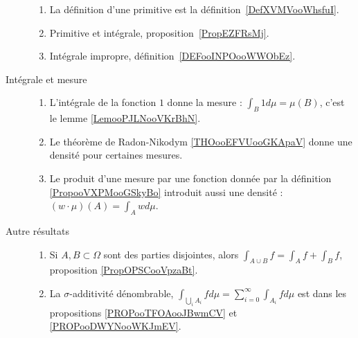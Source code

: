 \begin{description}
\begin{enumerate}
			\item
			      La définition d'une primitive est la définition~\ref{DefXVMVooWhsfuI}.
			\item
			      Primitive et intégrale, proposition~\ref{PropEZFRsMj}.
			\item
			      Intégrale impropre, définition~\ref{DEFooINPOooWWObEz}.
		\end{enumerate}
	\item[Intégrale et mesure]
		\begin{enumerate}
			\item
			      L'intégrale de la fonction \( 1\) donne la mesure : \( \int_B1d\mu=\mu(B)\), c'est le lemme \ref{LemooPJLNooVKrBhN}.
			\item
			      Le théorème de Radon-Nikodym \ref{THOooEFVUooGKApaV} donne une densité pour certaines mesures.
			\item
			      Le produit d'une mesure par une fonction donnée par la définition \ref{PropooVXPMooGSkyBo} introduit aussi une densité : \( (w\cdot \mu)(A)=\int_Awd\mu\).
		\end{enumerate}

	\item[Autre résultats]
		\begin{enumerate}
			\item
			      Si \( A,B\subset \Omega\) sont des parties disjointes, alors \( \int_{A\cup B}f=\int_Af+\int_Bf\), proposition \ref{PropOPSCooVpzaBt}.
			\item
			      La \( \sigma\)-additivité dénombrable, \( \int_{\bigcup_iA_i}fd\mu=\sum_{i=0}^{\infty}\int_{A_i}fd\mu\) est dans les propositions \ref{PROPooTFOAooJBwmCV} et \ref{PROPooDWYNooWKJmEV}.
		\end{enumerate}
\end{description}
